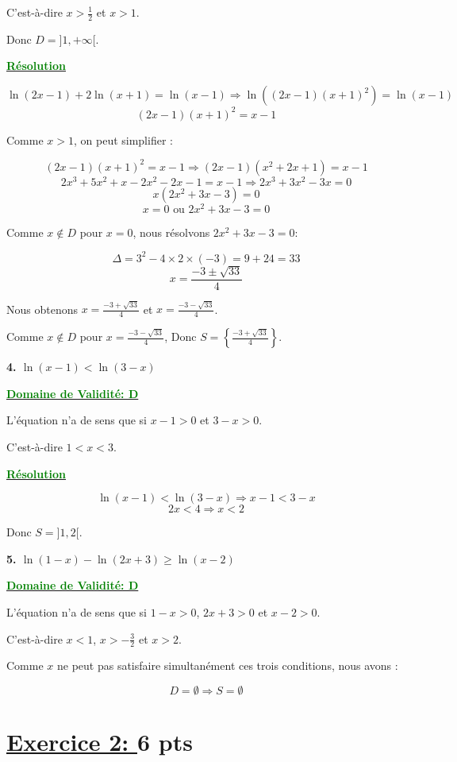 \documentclass[12pt]{article}
\begin{document}
C'est-à-dire \(x>\frac{1}{2}\) et \(x>1\).

Donc \(D = ]1, +\infty[\).

\textbf{\underline{\textcolor{green}{Résolution}}}

\[
\ln(2x-1)+2\ln(x+1)=\ln(x-1)\Longrightarrow \ln((2x-1)(x+1)^2)=\ln(x-1)
\]
\[
(2x-1)(x+1)^2=x-1
\]

Comme \(x > 1\), on peut simplifier :

\[
(2x-1)(x+1)^2=x-1 \Longrightarrow (2x-1)(x^2 + 2x + 1)=x-1
\]
\[
2x^3 + 5x^2 + x - 2x^2 - 2x - 1 = x - 1 \Longrightarrow 2x^3 + 3x^2 - 3x = 0
\]
\[
x(2x^2 + 3x - 3) = 0
\]
\[
x=0 \text{ ou } 2x^2 + 3x - 3 = 0
\]

Comme \(x \notin D\) pour \(x=0\), nous résolvons \(2x^2 + 3x - 3 = 0\):

\[
\Delta = 3^2 - 4 \times 2 \times (-3) = 9 + 24 = 33
\]
\[
x = \frac{-3 \pm \sqrt{33}}{4}
\]

Nous obtenons \(x = \frac{-3 + \sqrt{33}}{4}\) et \(x = \frac{-3 - \sqrt{33}}{4}\).

Comme \(x \notin D\) pour \(x = \frac{-3 - \sqrt{33}}{4}\), Donc \(S = \left\{\frac{-3 + \sqrt{33}}{4}\right\}\).

\textbf{4. \(\ln(x-1)<\ln(3-x)\)}

\textbf{\underline{\textcolor{green}{Domaine de Validité: D}}}

L'équation n'a de sens que si \(x-1>0\) et \(3-x>0\).

C'est-à-dire \(1<x<3\).

\textbf{\underline{\textcolor{green}{Résolution}}}

\[
\ln(x-1)<\ln(3-x)\Longrightarrow x-1<3-x
\]
\[
2x<4\Longrightarrow x<2
\]

Donc \(S=]1,2[\).

\textbf{5. \(\ln(1-x)-\ln(2x+3)\geq\ln(x-2)\)}

\textbf{\underline{\textcolor{green}{Domaine de Validité: D}}}

L'équation n'a de sens que si \(1-x>0\), \(2x+3>0\) et \(x-2>0\).

C'est-à-dire \(x<1\), \(x>-\frac{3}{2}\) et \(x>2\).

Comme \(x\) ne peut pas satisfaire simultanément ces trois conditions, nous avons :

\[
D = \emptyset \Longrightarrow S = \emptyset
\]

\section*{\underline{Exercice 2: }\textbf{6 pts}}
\end{document}
